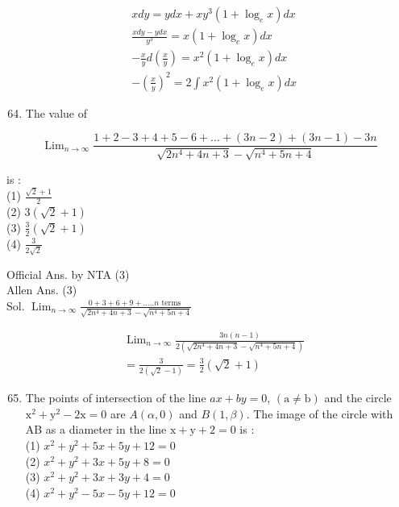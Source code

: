\documentclass[10pt]{article}
\begin{document}
\[
\begin{aligned}
& x d y=y d x+x y^{3}\left(1+\log _{e} x\right) d x \\
& \frac{x d y-y d x}{y^{3}}=x\left(1+\log _{e} x\right) d x \\
& -\frac{x}{y} d\left(\frac{x}{y}\right)=x^{2}\left(1+\log _{e} x\right) d x \\
& -\left(\frac{x}{y}\right)^{2}=2 \int x^{2}\left(1+\log _{e} x\right) d x
\end{aligned}
\]

\begin{enumerate}
  \setcounter{enumi}{63}
  \item The value of
\end{enumerate}

\[
\operatorname{Lim}_{n \rightarrow \infty} \frac{1+2-3+4+5-6+\ldots+(3 n-2)+(3 n-1)-3 n}{\sqrt{2 n^{4}+4 n+3}-\sqrt{n^{4}+5 n+4}}
\]

is :\\
(1) \(\frac{\sqrt{2}+1}{2}\)\\
(2) \(3(\sqrt{2}+1)\)\\
(3) \(\frac{3}{2}(\sqrt{2}+1)\)\\
(4) \(\frac{3}{2 \sqrt{2}}\)

Official Ans. by NTA (3)\\
Allen Ans. (3)\\
Sol. \(\operatorname{Lim}_{n \rightarrow \infty} \frac{0+3+6+9+\ldots . . n \text { terms }}{\sqrt{2 n^{4}+4 n+3}-\sqrt{n^{4}+5 n+4}}\)

\[
\begin{aligned}
& \operatorname{Lim}_{n \rightarrow \infty} \frac{3 n(n-1)}{2\left(\sqrt{2 n^{4}+4 n+3}-\sqrt{n^{4}+5 n+4}\right)} \\
& =\frac{3}{2(\sqrt{2}-1)}=\frac{3}{2}(\sqrt{2}+1)
\end{aligned}
\]

\begin{enumerate}
  \setcounter{enumi}{64}
  \item The points of intersection of the line \(a x+b y=0\), \((\mathrm{a} \neq \mathrm{b})\) and the circle \(\mathrm{x}^{2}+\mathrm{y}^{2}-2 \mathrm{x}=0\) are \(A(\alpha, 0)\) and \(B(1, \beta)\). The image of the circle with AB as a diameter in the line \(\mathrm{x}+\mathrm{y}+2=0\) is :\\
(1) \(x^{2}+y^{2}+5 x+5 y+12=0\)\\
(2) \(x^{2}+y^{2}+3 x+5 y+8=0\)\\
(3) \(x^{2}+y^{2}+3 x+3 y+4=0\)\\
(4) \(x^{2}+y^{2}-5 x-5 y+12=0\)
\end{enumerate}
\end{document}
